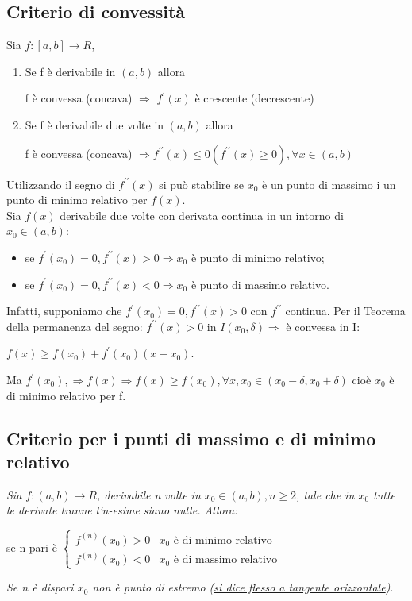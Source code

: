 \subsection{Criterio di convessità}
Sia $f:[a,b]\to R$,
\begin{enumerate}
	\item Se f è derivabile in $(a,b)$ allora
		\begin{center}
			f è convessa (concava) $\Rightarrow$ $f^\prime(x)$ è crescente
			(decrescente)
		\end{center}
	\item Se f è derivabile due volte in $(a,b)$ allora
		\begin{center}
			f è convessa (concava) $\Rightarrow f^{\prime\prime}(x)\leq
			0(f^{\prime\prime}(x)\geq 0), \forall x \in (a,b)$
		\end{center}
\end{enumerate}
Utilizzando il segno di $f^{\prime\prime}(x)$ si può stabilire se $x_0$ è un
punto di massimo i un punto di minimo relativo per $f(x)$.\\
Sia $f(x)$ derivabile due volte con derivata continua in un intorno di
$x_0\in(a,b)$:
\begin{itemize}
	\item se $f^{\prime}(x_0)=0, f^{\prime\prime}(x)>0\Rightarrow x_0$ è punto di minimo
relativo;
\item se $f^{\prime}(x_0)=0, f^{\prime\prime}(x)<0\Rightarrow x_0$ è punto di massimo
relativo.
\end{itemize}
Infatti, supponiamo che $f^{\prime}(x_0)=0, f^{\prime\prime}(x)>0$ con
$f^{\prime\prime}$ continua. Per il Teorema della permanenza del segno:
$f^{\prime\prime}(x)>0$ in $I(x_0,\delta)\Rightarrow$ è convessa in I:
\begin{center}
	$f(x)\geq f(x_0)+f^\prime(x_0)(x-x_0)$.
\end{center}
Ma $f^\prime (x_0), \Rightarrow f(x)\Rightarrow f(x) \geq f(x_0), \forall x,
x_0\in (x_0-\delta, x_0+\delta)$ cioè $x_0$ è di minimo relativo per f.
\subsection{Criterio per i punti di massimo e di minimo relativo}
\textit{Sia $f:(a,b)\to R$, derivabile n volte in $x_0\in (a,b), n\geq 2$, tale
che in $x_0$ tutte le derivate tranne l'n-esime siano nulle. Allora:}
\begin{center}
	se n pari è $\begin{cases}
		f^{(n)}(x_0)>0 & x_0\text{ è di minimo relativo}\\
		f^{(n)}(x_0)<0 & x_0\text{ è di massimo relativo}
	\end{cases}$
\end{center}
\textit{Se n è dispari $x_0$ non è punto di estremo (\underline{si dice flesso a tangente
orizzontale})}.
